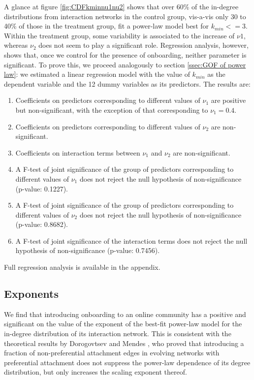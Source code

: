A glance at figure \ref{fig:CDFkminnu1nu2} shows that over 60\% of the in-degree distributions from interaction networks in the control group, vis-a-vis only 30 to 40\% of those in the treatment group, fit a power-law model best for $k_{min}<=3$. Within the treatment group, some variability is associated to the increase of $\nu1$, whereas $\nu_2$ does not seem to play a significant role. Regression analysis, however, shows that, once we control for the presence of onboarding, neither parameter is significant. To prove this, we proceed analogously to section \ref{ssec:GOF of power law}: we estimated a linear regression model with the value of $k_{min}$ as the dependent variable and the 12 dummy variables as its predictors. The results are:

\begin{enumerate}
\item Coefficients on predictors corresponding to different values of $\nu_1$ are positive but non-significant, with the exception of that corresponding to $\nu_1 = 0.4$.
\item Coefficients on predictors corresponding to different values of $\nu_2$ are non-significant.
\item Coefficients on interaction terms between $\nu_1$ and $\nu_2$ are non-significant.
\item A F-test of joint significance of the group of predictors corresponding to different values of $\nu_1$ does not reject the null hypothesis of non-significance (p-value: 0.1227).
\item A F-test of joint significance of the group of predictors corresponding to different values of $\nu_2$ does not reject the null hypothesis of non-significance (p-value: 0.8682).
\item A F-test of joint significance of the interaction terms does not reject the null hypothesis of non-significance (p-value: 0.7456).
\end{enumerate}

Full regression analysis is available in the appendix.


\subsection{Exponents} \label{ssec:exponents}
We find that introducing onboarding to an online community has a positive and significant on the value of the exponent of the best-fit power-law model for the in-degree distribution of its interaction network. This is consistent with the theoretical results by Dorogovtsev and Mendes \cite{dorogovtsev2002evolution}, who proved that introducing a fraction of non-preferential attachment edges in evolving networks with preferential attachment does not suppress the power-law dependence of its degree distribution, but only increases the scaling exponent thereof. 

